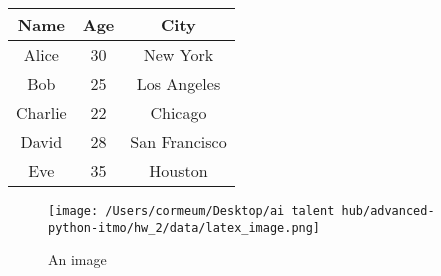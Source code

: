 \documentclass{article}
\begin{document}
\begin{tabular}{|c|c|c|}
\hline
Name & Age & City \\
\hline
Alice & 30 & New York \\
\hline
Bob & 25 & Los Angeles \\
\hline
Charlie & 22 & Chicago \\
\hline
David & 28 & San Francisco \\
\hline
Eve & 35 & Houston \\
\hline
\end{tabular}


\begin{figure}[h]
        \centering
        \texttt{[image: /Users/cormeum/Desktop/ai talent hub/advanced-python-itmo/hw\_2/data/latex\_image.png]}
        \caption{An image}
    \end{figure}
\end{document}
